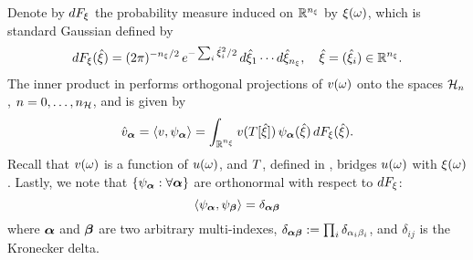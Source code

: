 Denote by $\d\distribution_\z$ the probability measure induced on $\real^\nvars$ by $\z(\o)$, which is standard Gaussian defined by
\[
  \d\distribution_\z(\hat{\z}) = (2 \pi)^{-\nvars/2} \, e^{-\sum_i \hat{\z}_i^2 / 2} \, \d\hat{\z}_1 \cdots \d\hat{\z}_\nvars, \hspace{1em} \hat{\z} = (\hat{\z}_i) \in \real^\nvars.
\]
The inner product in  performs orthogonal projections of $\w(\o)$ onto the spaces $\chaosSpace_n$, $n = 0, \dots, \ncorder$, and is given by
\begin{equation} \xelab{orthogonal-projection}
  \coefficient{\w}_{\multiindex} = \innerProduct{\w, \polynomial_{\multiindex}} = \int_{\real^{\nvars}} \w(\transformation[\hat{\z}]) \, \polynomial_{\multiindex}(\hat{\z}) \, \d\distribution_\z(\hat{\z}).
\end{equation}
Recall that $\w(\o)$ is a function of $\u(\o)$, and $\transformation$, defined in , bridges $\u(\o)$ with $\z(\o)$.
Lastly, we note that $\{ \polynomial_{\multiindex}: \forall \multiindex \}$ are orthonormal with respect to $\d\distribution_\z$:
\[
  \innerProduct{\polynomial_{\multiindex}, \polynomial_{\multiindex[\beta]}} = \delta_{\multiindex \multiindex[\beta]}
\]
where $\multiindex$ and $\multiindex[\beta]$ are two arbitrary multi-indexes, $\delta_{\multiindex \multiindex[\beta]} := \prod_i \delta_{\alpha_i \beta_i}$, and $\delta_{ij}$ is the Kronecker delta.
